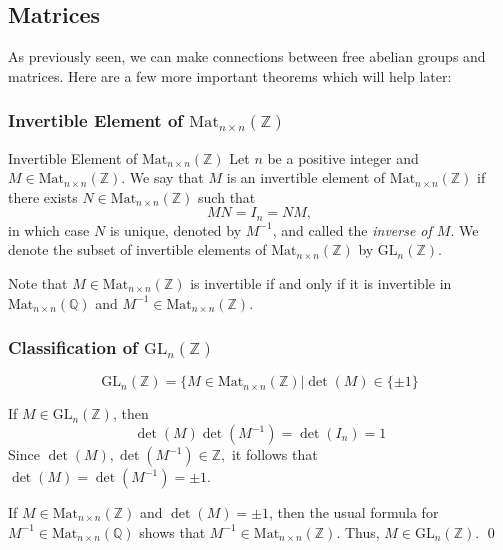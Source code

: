 \documentclass{article}
\renewenvironment{proof}{{\bfseries\color{blue1} Proof:}}{\qed}
\begin{document}
\subsection{Matrices}
As previously seen, we can make connections between free abelian groups and matrices. Here are a few more important theorems which will help later:
\subsubsection{Invertible Element of \texorpdfstring{$\text{Mat}_{n\times n}(\mathbb{Z})$}{Mat(nxn)(Z)}}
\begin{definition}{Invertible Element of $\text{Mat}_{n\times n}(\mathbb{Z})$}
    Let $n$ be a positive integer and $M \in \text{Mat}_{n\times n}(\mathbb{Z})$. We say that $M$ is an invertible element of $\text{Mat}_{n\times n}(\mathbb{Z})$ if there exists $N\in \text{Mat}_{n\times n}(\mathbb{Z})$ such that
    \begin{equation*}
        MN = I_n = NM,
    \end{equation*}
    in which case $N$ is unique, denoted by $M^{-1}$, and called the \textit{inverse of $M$}. We denote the subset of invertible elements of $\text{Mat}_{n\times n}(\mathbb{Z})$ by $\text{GL}_n(\mathbb{Z})$.
\end{definition}
Note that $M \in \text{Mat}_{n\times n}(\mathbb{Z})$ is invertible if and only if it is invertible in $\text{Mat}_{n\times n}(\mathbb{Q})$ and $M^{-1} \in \text{Mat}_{n\times n}(\mathbb{Z})$.

\subsubsection{Classification of $\text{GL}_n(\mathbb{Z})$}
\begin{idea}
    \begin{equation*}
        \text{GL}_n(\mathbb{Z}) = \{M \in \text{Mat}_{n\times n}(\mathbb{Z}) \vert \det(M) \in \{\pm 1\}
    \end{equation*}
\end{idea}
\begin{proof}
    If $M\in \text{GL}_n(\mathbb{Z})$, then
    \begin{equation*}
        \det(M)\det(M^{-1})=\det(I_n) = 1
    \end{equation*}
    Since $\det(M),\det(M^{-1}) \in \mathbb{Z},$ it follows that $\det(M)=\det(M^{-1})=\pm 1$.

    If $M\in \text{Mat}_{n\times n}(\mathbb{Z})$ and $\det(M) = \pm 1$, then the usual formula for $M^{-1}\in \text{Mat}_{n\times n}(\mathbb{Q})$ shows that $M^{-1}\in \text{Mat}_{n\times n}(\mathbb{Z})$. Thus, $M \in \text{GL}_n(\mathbb{Z}).$
\end{proof}
\end{document}
